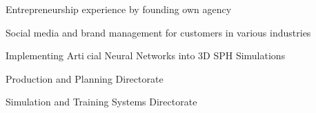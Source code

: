 
\begin{tightitemize}
\item Entrepreneurship experience by founding own agency
\item Social media and brand management for customers in various industries
\end{tightitemize}

\sectionspace %



\begin{tightitemize}
\item Implementing Articial Neural Networks into 3D SPH Simulations
\end{tightitemize}

\sectionspace %



\begin{tightitemize}
\item Production and Planning Directorate
\end{tightitemize}

\sectionspace %



\begin{tightitemize}
\item Simulation and Training Systems Directorate
\end{tightitemize}

\sectionspace %
